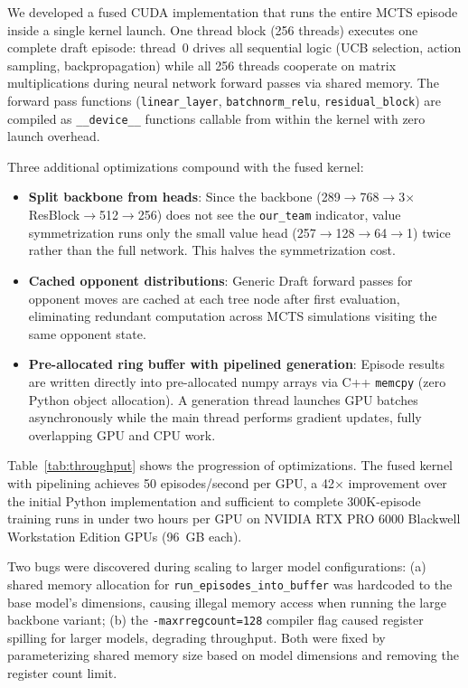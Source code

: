 \documentclass[journal]{IEEEtran}
\begin{document}
We developed a fused CUDA implementation that runs the entire MCTS episode inside a single kernel launch. One thread block (256 threads) executes one complete draft episode: thread~0 drives all sequential logic (UCB selection, action sampling, backpropagation) while all 256 threads cooperate on matrix multiplications during neural network forward passes via shared memory. The forward pass functions (\texttt{linear\_layer}, \texttt{batchnorm\_relu}, \texttt{residual\_block}) are compiled as \texttt{\_\_device\_\_} functions callable from within the kernel with zero launch overhead.

Three additional optimizations compound with the fused kernel:
\begin{itemize}
    \item \textbf{Split backbone from heads}: Since the backbone (289$\to$768$\to$3$\times$ResBlock$\to$512$\to$256) does not see the \texttt{our\_team} indicator, value symmetrization runs only the small value head (257$\to$128$\to$64$\to$1) twice rather than the full network. This halves the symmetrization cost.
    \item \textbf{Cached opponent distributions}: Generic Draft forward passes for opponent moves are cached at each tree node after first evaluation, eliminating redundant computation across MCTS simulations visiting the same opponent state.
    \item \textbf{Pre-allocated ring buffer with pipelined generation}: Episode results are written directly into pre-allocated numpy arrays via C++ \texttt{memcpy} (zero Python object allocation). A generation thread launches GPU batches asynchronously while the main thread performs gradient updates, fully overlapping GPU and CPU work.
\end{itemize}

Table~\ref{tab:throughput} shows the progression of optimizations. The fused kernel with pipelining achieves 50 episodes/second per GPU, a 42$\times$ improvement over the initial Python implementation and sufficient to complete 300K-episode training runs in under two hours per GPU on NVIDIA RTX PRO 6000 Blackwell Workstation Edition GPUs (96~GB each).

Two bugs were discovered during scaling to larger model configurations: (a) shared memory allocation for \texttt{run\_episodes\_into\_buffer} was hardcoded to the base model's dimensions, causing illegal memory access when running the large backbone variant; (b) the \texttt{-maxrregcount=128} compiler flag caused register spilling for larger models, degrading throughput. Both were fixed by parameterizing shared memory size based on model dimensions and removing the register count limit.
\end{document}
